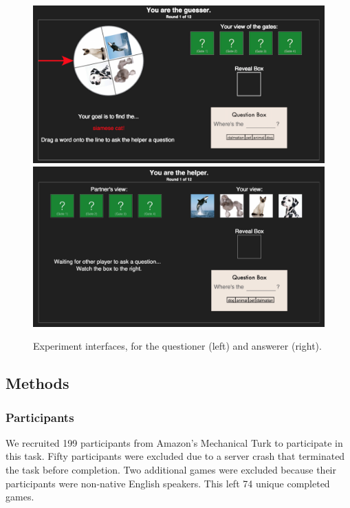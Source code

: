 \documentclass[12pt, floatsintext, jou]{apa6}
\begin{document}
\begin{figure}[t!]
\begin{center}
\includegraphics[scale = .213]{Exp4GuesserViewStart}
\includegraphics[scale = .105]{Exp4HelperViewStart}
\end{center}
\caption{Experiment interfaces, for the questioner (left) and answerer (right).}
\label{fig:expviews}
\end{figure}

\subsection{Methods}
\subsubsection{Participants} We recruited 199 participants from Amazon's Mechanical Turk to participate in this task. Fifty participants were excluded due to a server crash that terminated the task before completion. Two additional games were excluded because their participants were non-native English speakers. This left 74 unique completed games.
\end{document}
